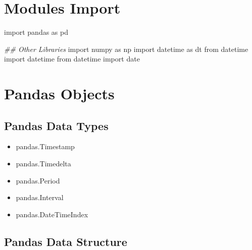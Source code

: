 \documentclass[
]{book}
\newenvironment{Shaded}{\begin{snugshade}}{\end{snugshade}}
\newcommand{\CommentTok}[1]{\textcolor[rgb]{0.37,0.37,0.37}{\textit{#1}}}
\newcommand{\ImportTok}[1]{#1}
\newcommand{\NormalTok}[1]{#1}
\providecommand{\tightlist}{%
  \setlength{\itemsep}{0pt}\setlength{\parskip}{0pt}}
\begin{document}
\hypertarget{modules-import}{%
\section{Modules Import}\label{modules-import}}

\begin{Shaded}
\begin{Highlighting}[]
\ImportTok{import}\NormalTok{ pandas }\ImportTok{as}\NormalTok{ pd}

\CommentTok{## Other Libraries}
\ImportTok{import}\NormalTok{ numpy }\ImportTok{as}\NormalTok{ np}
\ImportTok{import}\NormalTok{ datetime }\ImportTok{as}\NormalTok{ dt}
\ImportTok{from}\NormalTok{ datetime }\ImportTok{import}\NormalTok{ datetime}
\ImportTok{from}\NormalTok{ datetime }\ImportTok{import}\NormalTok{ date}
\end{Highlighting}
\end{Shaded}

\hypertarget{pandas-objects}{%
\section{Pandas Objects}\label{pandas-objects}}

\hypertarget{pandas-data-types}{%
\subsection{Pandas Data Types}\label{pandas-data-types}}

\begin{itemize}
\tightlist
\item
  pandas.Timestamp
\item
  pandas.Timedelta
\item
  pandas.Period
\item
  pandas.Interval
\item
  pandas.DateTimeIndex
\end{itemize}

\hypertarget{pandas-data-structure}{%
\subsection{Pandas Data Structure}\label{pandas-data-structure}}
\end{document}
